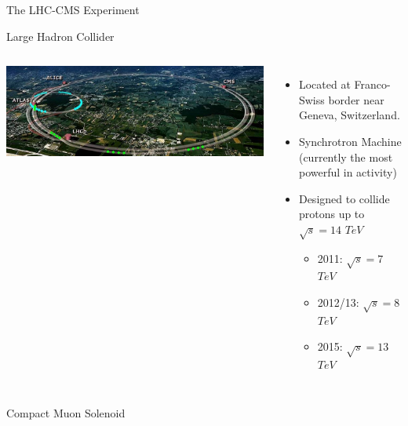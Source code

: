 \documentclass[8pt]{beamer}
\begin{document}
\begin{frame}{The LHC-CMS Experiment}
 
  \begin{block}{Large Hadron Collider}
  
    \vspace{-5mm}
    \begin{columns}

      \column[t]{5.5cm}
      \begin{center}
        \includegraphics[width=1.00\textwidth]{img/LHCMap.jpg} 
      \end{center}

      \column[t]{5.5cm}

      \begin{itemize}
        \item Located at Franco-Swiss border near Geneva, Switzerland.
        \item Synchrotron Machine (currently the most powerful in activity)
        \item Designed to collide protons up to $\sqrt{s}=14$ $TeV$
        \begin{itemize}
          \item \tiny 2011: $\sqrt{s}=7$ $TeV$ 
          \item \tiny 2012/13: $\sqrt{s}=8$ $TeV$ 
          \item \tiny 2015: $\sqrt{s}=13$ $TeV$
        \end{itemize}
      \end{itemize}

    \end{columns}

  \end{block}

  \begin{block}{Compact Muon Solenoid}

    \vspace{-5mm}
    \begin{columns}
      \column[t]{6.5cm}


\end{columns}
\end{block}
\end{frame}
\end{document}
